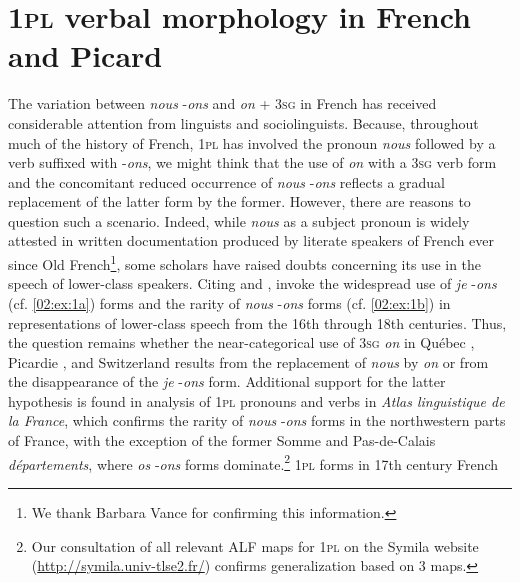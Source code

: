 \documentclass[output=paper,colorlinks,citecolor=brown]{langscibook}
\begin{document}
\section{1\textsc{pl} verbal morphology in French and Picard}
The variation between \textit{nous} -\textit{ons} and \textit{on} + 3\textsc{sg} in French has received considerable attention from linguists and sociolinguists. Because, throughout much of the history of French, 1\textsc{pl} has involved the pronoun \textit{nous} followed by a verb suffixed with -\textit{ons}, we might think that the use of \textit{on} with a 3\textsc{sg} verb form and the concomitant reduced occurrence of \textit{nous} -\textit{ons} reflects a gradual replacement of the latter form by the former. However, there are reasons to question such a scenario. Indeed, while \textit{nous} as a subject pronoun is widely attested in written documentation produced by literate speakers of French ever since Old French\footnote{We thank Barbara Vance for confirming this information.},  some scholars have raised doubts concerning its use in the speech of lower-class speakers. Citing \citet{coveney_vestiges_2000} and \citet{lodge_sociolinguistic_2004}, \citet{king_interplay_2011} invoke the widespread use of \textit{je} -\textit{ons} (cf. \ref{02:ex:1a}) forms and the rarity of \textit{nous} -\textit{ons} forms (cf. \ref{02:ex:1b}) in representations of lower-class speech from the 16th through 18th centuries. Thus, the question remains whether the near-categorical use of 3\textsc{sg} \textit{on} in Québec \citep{laberge_etude_1977}, Picardie \citep{coveney_vestiges_2000}, and Switzerland \citep{fonseca-greber_subject_2003} results from the replacement of \textit{nous} by \textit{on} or from the disappearance of the \textit{je} -\textit{ons} form. Additional support for the latter hypothesis is found in  analysis of 1\textsc{pl} pronouns and verbs in \textit{Atlas linguistique de la France}, which confirms the rarity of \textit{nous} -\textit{ons} forms in the northwestern parts of France, with the exception of the former Somme and Pas-de-Calais \textit{départements}, where \textit{os} -\textit{ons} forms dominate.\footnote{Our consultation of all relevant ALF maps for 1\textsc{pl} on the Symila website (\url{http://symila.univ-tlse2.fr/}) confirms  generalization based on 3 maps.}
\ea \label{02:ex:1}
1\textsc{pl} forms in 17th century French 
\end{document}
